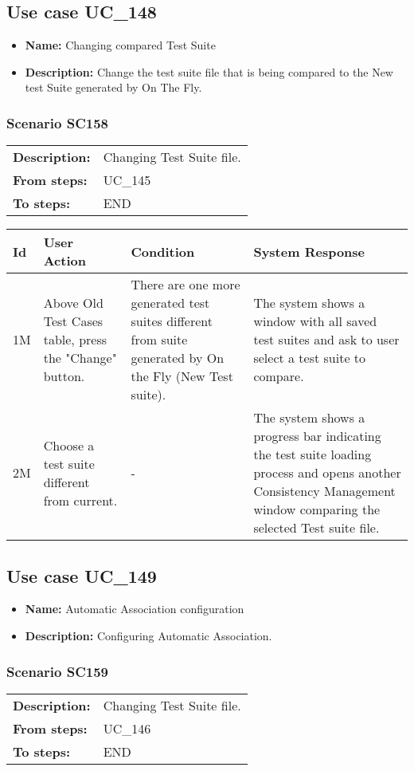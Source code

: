 \documentclass[a4paper,11pt]{article}
\newcommand{\bl}{\\ \hline}
\begin{document}
\subsection*{Use case UC_148}
\begin{itemize}
\item {\bf Name: }Changing compared Test Suite
\item {\bf Description: }Change the test suite file that is being compared to the
				New test Suite generated by On The Fly.
\end{itemize}
\subsubsection*{Scenario SC158}
\begin{tabular}{p{1in}p{4in}}
{\bf Description:} & Changing Test Suite file. \\
{\bf From steps:} & UC_145#2M \\
{\bf To steps:} & END \\
\end{tabular}
 
\begin{tabular}{|p{0.8in}|p{1.6in}|p{1.6in}|p{1.6in}|}
\hline
Id & User Action & Condition & System Response  \bl 
1M & Above Old Test Cases table, press the "Change" button.
					 & There are one more generated test suites different from
						suite generated by On the Fly (New Test suite). & The system shows a window with all saved test suites and
						ask to user select a test suite to compare. \bl 
2M & Choose a test suite different from current. & - & The system shows a progress bar indicating the test suite
						loading process and opens another Consistency Management window
						comparing the selected Test suite file. \bl 
\end{tabular}
\subsection*{Use case UC_149}
\begin{itemize}
\item {\bf Name: }Automatic Association configuration
\item {\bf Description: }Configuring Automatic Association.
\end{itemize}
\subsubsection*{Scenario SC159}
\begin{tabular}{p{1in}p{4in}}
{\bf Description:} & Changing Test Suite file. \\
{\bf From steps:} & UC_146#1A \\
{\bf To steps:} & END \\
\end{tabular}
 
\end{document}
